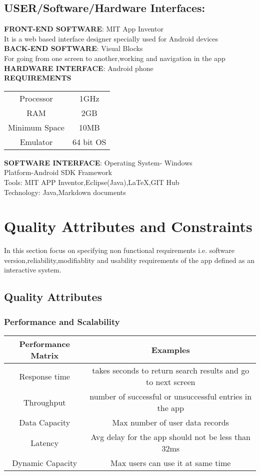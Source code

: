 \documentclass{article}
\begin{document}
\subsection{USER/Software/Hardware Interfaces:}
\textbf{FRONT-END SOFTWARE}: MIT App Inventor\\
It is a web based interface designer specially used for Android devices\\
\textbf{BACK-END SOFTWARE}: Visual Blocks \\
For going from one screen to another,working and navigation in the app\\

\textbf{HARDWARE INTERFACE}: Android phone \\ 
\textbf{REQUIREMENTS}

\begin{tabular}{c|c}
\hline
    Processor    & 1GHz\\
    RAM          & 2GB\\
    Minimum Space& 10MB\\
    Emulator     & 64 bit OS\\
\hline
\end{tabular}

\textbf{SOFTWARE INTERFACE}: Operating System- Windows\\
Platform-Android SDK Framework\\
Tools: MIT APP Inventor,Eclipse(Java),LaTeX,GIT Hub\\
Technology: Java,Markdown documents\\


\section{Quality Attributes and Constraints}
In this section focus on specifying non functional requirements i.e. software version,reliability,modifiablity and usability requirements of the app defined as an interactive system.
\subsection{Quality Attributes}

\subsubsection{Performance and Scalability}

\begin{tabular}{c|c}
\hline
    \textbf{Performance Matrix} &  \textbf{Examples}\\
\hline
    Response time               &    takes seconds to return search results and go to next screen\\
    Throughput                  &  number of successful or unsuccessful entries in the app\\
    Data Capacity               &   Max number of user data records\\
    Latency                     &   Avg delay for the app should not be less than 32ms\\
    Dynamic Capacity            &  Max users can use it at same time\\
\hline
\end{tabular}
\end{document}
